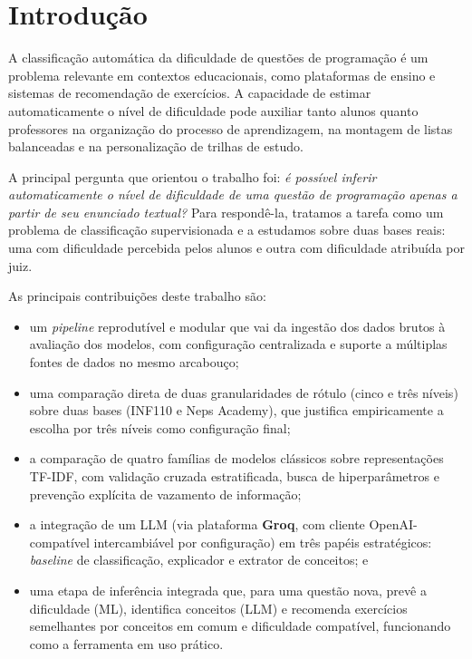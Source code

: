 \documentclass[sigconf]{webmedia}
\begin{document}
\section{Introdução}

A classificação automática da dificuldade de questões de programação é um problema relevante em contextos educacionais, como plataformas de ensino e sistemas de recomendação de exercícios. A capacidade de estimar automaticamente o nível de dificuldade pode auxiliar tanto alunos quanto professores na organização do processo de aprendizagem, na montagem de listas balanceadas e na personalização de trilhas de estudo.

A principal pergunta que orientou o trabalho foi: \textit{é possível inferir automaticamente o nível de dificuldade de uma questão de programação apenas a partir de seu enunciado textual?} Para respondê-la, tratamos a tarefa como um problema de classificação supervisionada e a estudamos sobre duas bases reais: uma com dificuldade percebida pelos alunos e outra com dificuldade atribuída por juiz.

As principais contribuições deste trabalho são:
\begin{itemize}
  \item um \textit{pipeline} reprodutível e modular que vai da ingestão dos dados brutos à avaliação dos modelos, com configuração centralizada e suporte a múltiplas fontes de dados no mesmo arcabouço;
  \item uma comparação direta de duas granularidades de rótulo (cinco e três níveis) sobre duas bases (INF110 e Neps Academy), que justifica empiricamente a escolha por três níveis como configuração final;
  \item a comparação de quatro famílias de modelos clássicos sobre representações TF-IDF, com validação cruzada estratificada, busca de hiperparâmetros e prevenção explícita de vazamento de informação;
  \item a integração de um LLM (via plataforma \textbf{Groq}, com cliente OpenAI-compatível intercambiável por configuração) em três papéis estratégicos: \textit{baseline} de classificação, explicador e extrator de conceitos; e
  \item uma etapa de inferência integrada que, para uma questão nova, prevê a dificuldade (ML), identifica conceitos (LLM) e recomenda exercícios semelhantes por conceitos em comum e dificuldade compatível, funcionando como a ferramenta em uso prático.
\end{itemize}
\end{document}
